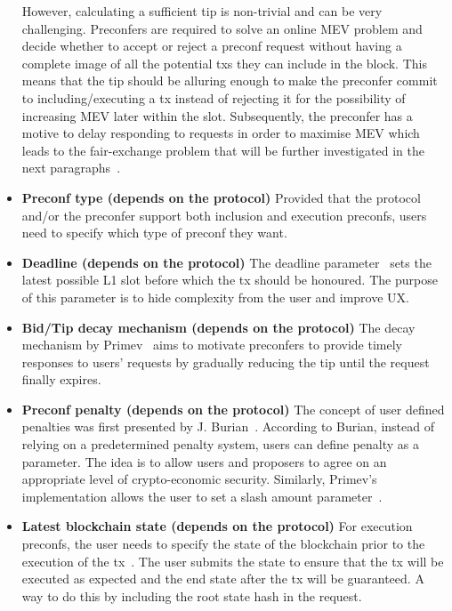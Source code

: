 \documentclass[conference]{IEEEtran}
\theoremstyle{boldstyle}
\begin{document}
\begin{itemize}
        However, calculating a sufficient tip is non-trivial and can be very challenging. Preconfers are required to solve an online MEV problem and decide whether to accept or reject a preconf request without having a complete image of all the potential txs they can include in the block. This means that the tip should be alluring enough to make the preconfer commit to including/executing a tx instead of rejecting it for the possibility of increasing MEV later within the slot. Subsequently, the preconfer has a motive to delay responding to requests in order to maximise MEV which leads to the fair-exchange problem that will be further investigated in the next paragraphs~\cite{W:StrawmanningBasedPreconfirmations}.
        \item \textbf{Preconf type (depends on the protocol)} Provided that the protocol and/or the preconfer support both inclusion and execution preconfs, users need to specify which type of preconf they want.
        \item \textbf{Deadline (depends on the protocol)} The deadline parameter~\cite{W:PreconfirmationsforVanillaBasedRollups} sets the latest possible L1 slot before which the tx should be honoured. The purpose of this parameter is to hide complexity from the user and improve UX.
        \item \textbf{Bid/Tip decay mechanism (depends on the protocol)} The decay mechanism by Primev~\cite{W:Documentation-BidDecayMechanism} aims to motivate preconfers to provide timely responses to users' requests by gradually reducing the tip until the request finally expires.
        \item \textbf{Preconf penalty (depends on the protocol)} The concept of user defined penalties was first presented by J. Burian~\cite{W:User-DefinedPenalties:EnsuringHonestPreconfBehavior}. According to Burian, instead of relying on a predetermined penalty system, users can define penalty as a parameter. The idea is to allow users and proposers to agree on an appropriate level of crypto-economic security. Similarly, Primev's implementation allows the user to set a slash amount parameter~\cite{W:Documentation-BidStructure}.
        \item \textbf{Latest blockchain state (depends on the protocol)} For execution preconfs, the user needs to specify the state of the blockchain prior to the execution of the tx~\cite{W:AnalyzingBFTProposer-PromisedPreconfirmations}. The user submits the state to ensure that the tx will be executed as expected and the end state after the tx will be guaranteed. A way to do this by including the root state hash in the request.

\end{itemize}
\end{document}
